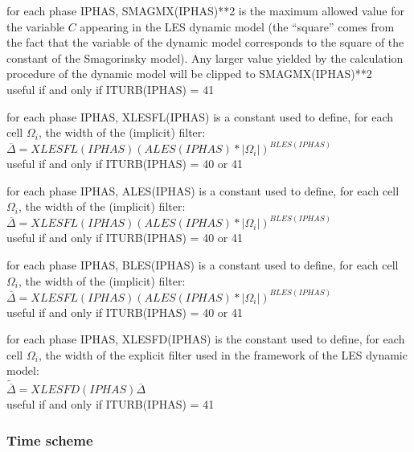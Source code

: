 {for each phase IPHAS, SMAGMX(IPHAS)**2 is
the maximum allowed value for the variable $C$ appearing in the LES dynamic
model (the ``square'' comes from the fact that the
variable of the dynamic model corresponds to the square of the
constant of the Smagorinsky model). Any larger value yielded by the calculation
procedure of the dynamic model will be clipped to SMAGMX(IPHAS)**2\\
useful if and only if ITURB(IPHAS) = 41}

{for each phase IPHAS, XLESFL(IPHAS) is a constant used to define, for
each cell $\Omega_i$, the width of the (implicit) filter:\\
$\overline{\Delta}=XLESFL(IPHAS)(ALES(IPHAS)*|\Omega_i|)^{BLES(IPHAS)}$\\
useful if and only if ITURB(IPHAS) = 40 or 41}

{for each phase IPHAS, ALES(IPHAS) is a constant used to define, for
each cell $\Omega_i$, the width of the (implicit) filter:\\
$\overline{\Delta}=XLESFL(IPHAS)(ALES(IPHAS)*|\Omega_i|)^{BLES(IPHAS)}$\\ 
useful if and only if ITURB(IPHAS) = 40 or 41}

{for each phase IPHAS, BLES(IPHAS) is a constant used to define, for
each cell $\Omega_i$, the width of the (implicit) filter:\\
$\overline{\Delta}=XLESFL(IPHAS)(ALES(IPHAS)*|\Omega_i|)^{BLES(IPHAS)}$\\
useful if and only if ITURB(IPHAS) = 40 or 41}

{for each phase IPHAS, XLESFD(IPHAS) is the constant used to define, for
each cell $\Omega_i$, the width of the explicit filter used in the framework of
the LES dynamic model:\\
$\widetilde{\overline{\Delta}}=XLESFD(IPHAS)\overline{\Delta}$\\ 
useful if and only if ITURB(IPHAS) = 41}



\subsubsection{Time scheme}

